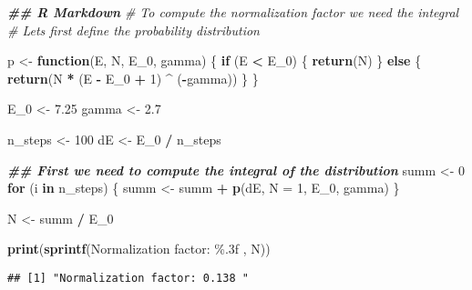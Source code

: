 \documentclass[
]{article}
\newenvironment{Shaded}{\begin{snugshade}}{\end{snugshade}}
\newcommand{\AttributeTok}[1]{\textcolor[rgb]{0.13,0.29,0.53}{#1}}
\newcommand{\CommentTok}[1]{\textcolor[rgb]{0.56,0.35,0.01}{\textit{#1}}}
\newcommand{\ControlFlowTok}[1]{\textcolor[rgb]{0.13,0.29,0.53}{\textbf{#1}}}
\newcommand{\DecValTok}[1]{\textcolor[rgb]{0.00,0.00,0.81}{#1}}
\newcommand{\DocumentationTok}[1]{\textcolor[rgb]{0.56,0.35,0.01}{\textbf{\textit{#1}}}}
\newcommand{\FloatTok}[1]{\textcolor[rgb]{0.00,0.00,0.81}{#1}}
\newcommand{\FunctionTok}[1]{\textcolor[rgb]{0.13,0.29,0.53}{\textbf{#1}}}
\newcommand{\NormalTok}[1]{#1}
\newcommand{\OtherTok}[1]{\textcolor[rgb]{0.56,0.35,0.01}{#1}}
\newcommand{\SpecialCharTok}[1]{\textcolor[rgb]{0.81,0.36,0.00}{\textbf{#1}}}
\newcommand{\StringTok}[1]{\textcolor[rgb]{0.31,0.60,0.02}{#1}}
\begin{document}
\begin{Shaded}
\begin{Highlighting}[]
\DocumentationTok{\#\# R Markdown}
\CommentTok{\# To compute the normalization factor we need the integral }
\CommentTok{\# Let\textquotesingle{}s first define the probability distribution}

\NormalTok{p }\OtherTok{\textless{}{-}} \ControlFlowTok{function}\NormalTok{(E, N, E\_0, gamma) \{}
  \ControlFlowTok{if}\NormalTok{ (E }\SpecialCharTok{\textless{}}\NormalTok{ E\_0) \{}
    \FunctionTok{return}\NormalTok{(N)}
\NormalTok{  \} }\ControlFlowTok{else}\NormalTok{ \{}
    \FunctionTok{return}\NormalTok{(N }\SpecialCharTok{*}\NormalTok{ (E }\SpecialCharTok{{-}}\NormalTok{ E\_0 }\SpecialCharTok{+} \DecValTok{1}\NormalTok{) }\SpecialCharTok{\^{}}\NormalTok{ (}\SpecialCharTok{{-}}\NormalTok{gamma))}
\NormalTok{  \}}
\NormalTok{\}}

\NormalTok{E\_0 }\OtherTok{\textless{}{-}} \FloatTok{7.25}
\NormalTok{gamma }\OtherTok{\textless{}{-}} \FloatTok{2.7}

\NormalTok{n\_steps }\OtherTok{\textless{}{-}} \DecValTok{100}
\NormalTok{dE }\OtherTok{\textless{}{-}}\NormalTok{ E\_0 }\SpecialCharTok{/}\NormalTok{ n\_steps}

\DocumentationTok{\#\# First we need to compute the integral of the distribution}
\NormalTok{summ }\OtherTok{\textless{}{-}} \DecValTok{0}
\ControlFlowTok{for}\NormalTok{ (i }\ControlFlowTok{in}\NormalTok{ n\_steps) \{}
\NormalTok{  summ }\OtherTok{\textless{}{-}}\NormalTok{ summ }\SpecialCharTok{+} \FunctionTok{p}\NormalTok{(dE, }\AttributeTok{N =} \DecValTok{1}\NormalTok{, E\_0, gamma)}
\NormalTok{\}}

\NormalTok{N }\OtherTok{\textless{}{-}}\NormalTok{ summ }\SpecialCharTok{/}\NormalTok{ E\_0}

\FunctionTok{print}\NormalTok{(}\FunctionTok{sprintf}\NormalTok{(}\StringTok{\textquotesingle{}Normalization factor: \%.3f \textquotesingle{}}\NormalTok{, N))}
\end{Highlighting}
\end{Shaded}

\begin{verbatim}
## [1] "Normalization factor: 0.138 "
\end{verbatim}
\end{document}
